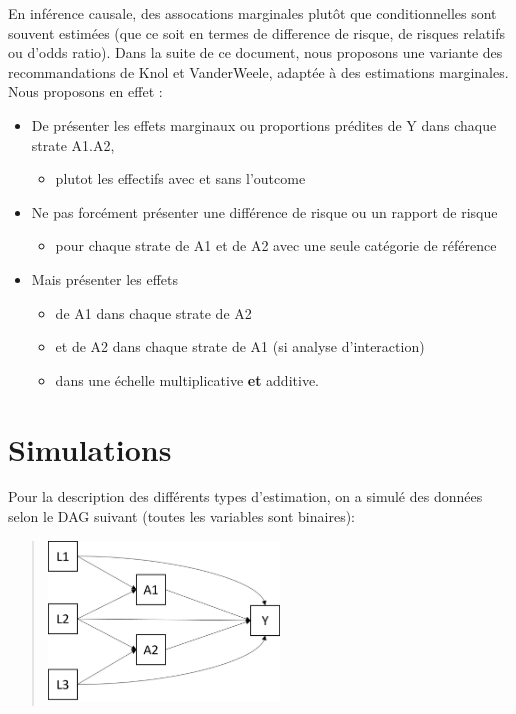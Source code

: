 \documentclass[
]{book}
\providecommand{\tightlist}{%
  \setlength{\itemsep}{0pt}\setlength{\parskip}{0pt}}
\begin{document}
En inférence causale, des assocations marginales plutôt que conditionnelles sont souvent estimées (que ce soit en termes de difference de risque, de risques relatifs ou d'odds ratio). Dans la suite de ce document, nous proposons une variante des recommandations de Knol et VanderWeele, adaptée à des estimations marginales. Nous proposons en effet :

\begin{itemize}
\tightlist
\item
  De présenter les effets marginaux ou proportions prédites de Y dans chaque strate A1.A2,

  \begin{itemize}
  \tightlist
  \item
    plutot les effectifs avec et sans l'outcome
  \end{itemize}
\item
  Ne pas forcément présenter une différence de risque ou un rapport de risque

  \begin{itemize}
  \tightlist
  \item
    pour chaque strate de A1 et de A2 avec une seule catégorie de référence
  \end{itemize}
\item
  Mais présenter les effets

  \begin{itemize}
  \tightlist
  \item
    de A1 dans chaque strate de A2
  \item
    et de A2 dans chaque strate de A1 (si analyse d'interaction)
  \item
    dans une échelle multiplicative \textbf{et} additive.
  \end{itemize}
\end{itemize}

\hypertarget{simulations}{%
\chapter{Simulations}\label{simulations}}

Pour la description des différents types d'estimation, on a simulé des données selon le DAG suivant (toutes les variables sont binaires):

\begin{quote}
\includegraphics[width=0.5\textwidth,height=\textheight]{img/Image10.png}
\end{quote}
\end{document}
